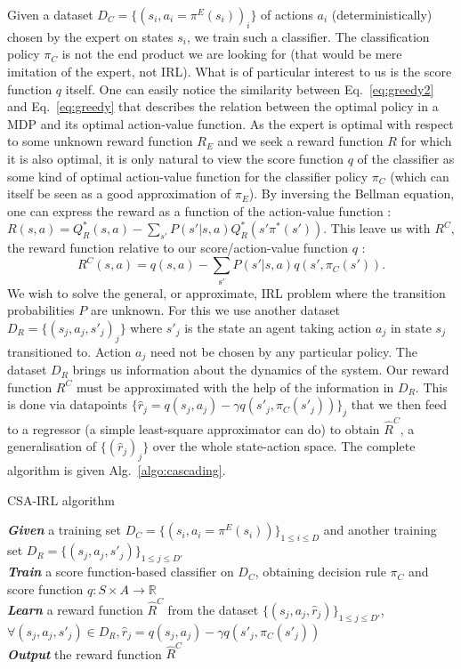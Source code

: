 \documentclass[smallextended]{svjour3}
\begin{document}
Given a dataset $D_C = \{(s_i,a_i=\pi^E(s_i))_i\}$ of actions $a_i$ (deterministically) chosen by the expert on states $s_i$, we train such a classifier. The classification policy $\pi_C$ is not the end product we are looking for (that would be mere imitation of the expert, not IRL). What is of particular interest to us is the score function $q$ itself. One can easily notice the similarity between Eq.~\ref{eq:greedy2} and Eq.~\ref{eq:greedy} that describes the relation between the optimal policy in a MDP and its optimal action-value function. As the expert is optimal with respect to some unknown reward function $R_E$ and we seek a reward function $R$ for which it is also optimal, it is only natural to view the score function $q$ of the classifier as some kind of optimal action-value function for the classifier policy $\pi_C$ (which can itself be seen as a good approximation of $\pi_E$). By inversing the Bellman equation, one can express the reward as a function of the action-value function : $R(s,a) = Q^*_R(s,a) - \sum_{s'}P(s'|s,a)Q^*_R(s'\pi^*(s'))$. This leave us with $R^C$, the reward function relative to our score/action-value function $q$ :
\begin{equation}
  R^C(s,a) =q(s,a) - \sum_{\mathrm{s'}}P(s'|s,a)q(s',\pi_C(s')).
\end{equation}
We wish to solve the general, or approximate, IRL problem where the transition probabilities $P$ are unknown. For this we use another dataset $D_R = \{(s_j,a_j,s'_j)_j\}$ where $s'_j$ is the state an agent taking action $a_j$ in state $s_j$ transitioned to. Action $a_j$ need not be chosen by any particular policy. The dataset $D_R$ brings us information about the dynamics of the system. Our reward function $R^C$ must be approximated with the help of the information in $D_R$. This is done via datapoints $\{\hat r_j = q(s_j,a_j) - \gamma q(s'_j,\pi_C(s'_j))\}_j$ that we then feed to a regressor (a simple least-square approximator can do) to obtain $\hat R^C$, a generalisation of $\{(\hat r_j)_j\}$ over the whole state-action space. The complete algorithm is given Alg.~\ref{algo:cascading}.
\begin{algorithm}%
  \caption{CSA-IRL algorithm}
  \label{algo:cascading}
  \emph{\textbf{Given}} a training set $D_C=\{(s_i,a_i=\pi^E(s_i))\}_{1\leq i \leq D}$ and another training set $D_R=\{(s_{j},a_{j},s'_{j})\}_{1\leq j \leq D'}$\;\\
  \emph{\textbf{Train}} a score function-based classifier on $D_C$, obtaining decision rule $\pi_C$ and score function $q:S\times A \rightarrow \mathbb R$\;\\
  \emph{\textbf{Learn}} a reward function $\hat R^C$ from the dataset $\{(s_{j},a_{j},\hat{r}_j)\}_{1\leq j \leq D'}$, $\forall (s_j,a_j,s'_j) \in D_R,\hat{r}_j=q(s_{j},a_{j})-\gamma q(s'_{j},\pi_C(s'_{j}))$\;\\
  \emph{\textbf{Output}} the reward function $\hat R^{C}$ \;
\end{algorithm}
\end{document}
